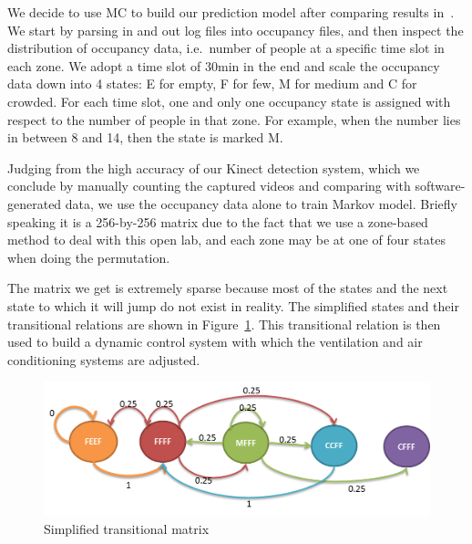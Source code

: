 \documentclass{sig-alternate}
\begin{document}
We decide to use MC to build our prediction model after comparing
results
in~\cite{ref:Erickson:2009,ref:Erickson:2010}. We start by parsing in
and out log files into occupancy files, and then inspect the
distribution of occupancy data, i.e.\ number of people at a specific
time slot in each zone. We adopt a time slot of 30min in the end and
scale the occupancy data down into 4 states: E for empty, F for few, M
for medium and C for crowded. For each time slot, one and only one
occupancy state is assigned with respect to the number of people in
that zone. For example, when the number lies in between 8 and 14, then
the state is marked M.
\par
Judging from the high accuracy of our Kinect detection system, which
we conclude by manually counting the captured videos and comparing
with software-generated data, we use the occupancy data alone to train
Markov model. Briefly speaking it is a 256-by-256 matrix due to the
fact that we use a zone-based method to deal with this open lab, and
each zone may be at one of four states when doing the permutation.
\par
The matrix we get is extremely sparse because most of the states and
the next state to which it will jump do not exist in reality. The
simplified states and their transitional relations are shown in
Figure~\ref{fig:transitional-matrix}. This transitional relation is
then used to build a dynamic control system with which the ventilation
and air conditioning systems are adjusted.

\begin{figure}[!tb]
  \centering
  \includegraphics[scale=0.45]{mcc}
  \caption{Simplified transitional matrix}
  \label{fig:transitional-matrix}
\end{figure}


\end{document}
